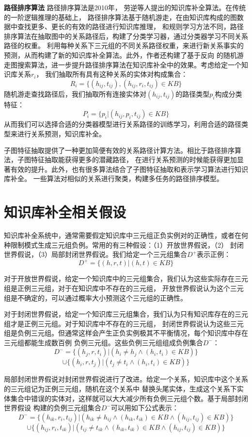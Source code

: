 \textbf{路径排序算法} 路径排序算法\cite{Lao2010}是2010年，
劳逆等人提出的知识库补全算法。在传统的一阶逻辑推理的基础上，
路径排序算法基于随机游走，在由知识库构成的图数据中查找更多、更长的有效的路径进行知识库推理，
和规则学习方法不同，路径排序算法在抽取图中的关系路径后，构建了分类学习器，通过分类器学习不同关系路径的权重。
利用每种关系下三元组的不同关系路径权重，来进行新关系事实的预测，从而构建了新的知识库补全算法。此外，作者还构建了基于反向
的随机游走图搜索算法\cite{Lao2015LearningRF}，进一步提升路径排序算法在知识库补全中的效果。考虑给定一个知识库关系$r_i$，
我们抽取所有具有这种关系的实体对构成集合：
$$R_i=\{{(h_{ij},t_{ij}),(h_{ij},r_i,t_{ij})\in KB}\}$$
随机游走查找路径后，我们抽取所有连接实体对$(h_{ij},t_{ij})$的路径类型$p_i$构成分类特征：
$$P_i=\{{p_i|(h_{ij},p_i,t_{ij})\in KB}\}$$
从而我们可以选择合适的分类器模型进行关系路径的训练学习，利用合适的路径类型来进行关系预测，知识库补全。

子图特征抽取\cite{Gardner2015}提供了一种更加简便有效的关系路径计算方法。相比于路径排序算法，子图特征抽取能获得更多的潜藏路径，
在进行关系预测的时候能获得更加显著有效的提升。此外，也有很多算法结合了子图特征抽取和表示学习算法\cite{Gardner2014}进行知识库补全。
一些算法对相似的关系进行聚类，构建多任务的路径排序模型\cite{Wang2016}。


\section{知识库补全相关假设}
知识库补全系统中，通常需要假定知识库中三元组正负实例对的正确性，或者在何种限制模式生成三元组负例。常用的有三种假设：（1）开放世界假说，（2）
封闭世界假说，（3）局部封闭世界假说。我们给定一个三元组集合$D^+$表示正例：
$$D^+=\{(h,r,t)|(h,t) \in KB\}$$

对于开放世界假说，给定一个知识库中的三元组集合，我们认为这些实际存在三元组是正例三元组，对于在知识库中不存在的三元组，
开放世界假说认为这个三元组是不确定的，可以通过概率大小预测这个三元组的正确性。

对于封闭世界假说，给定一个知识库三元组集合，我们认为只有知识库存在的三元组才是正例三元组。对于知识库中不存在的三元组，
封闭世界假说认为这些三元组是负例三元组。但通常这样会产生正负实例极其不平衡情况，每个知识库中存在三元组都能生成数百例
负例三元组。这些负例三元组组成负例集合$D^-$：
$$D^-=\{(h_j,r,t_i)|(h_i \ne h_j \wedge (h_i,t_i) \in KB)\}$$
$$ \cup \{(h_i,r,t_j)|(t_j \ne t_i \wedge(h_i,t_i) \in KB)\}$$

局部封闭世界假说对封闭世界假说进行了改进。给定一个关系，知识库中这个关系的三元组记为正例三元组，随机在这个关系中
替换头尾实体，生成这个关系下实体集合中错误的实体对，这样就可以大大减少所有负例三元组个数。基于局部封闭世界假设
构建的负例三元组集合$D^-$可以用如下公式表示：
$$D^-=\{(h_{ik},r_i,t_{ij})|(h_{ik} \ne h_{ij} \wedge (h_{ik},t_{ik}) \in KB  \wedge (h_{ij},t_{ij}) \in KB)\}$$
$$ \cup \{(h_{ij},r_i,t_{ik})|(t_{ij} \ne t_{ik} \wedge(h_{ik},t_{ik}) \in KB \wedge(h_{ij},t_{ij}) \in KB)\}$$

